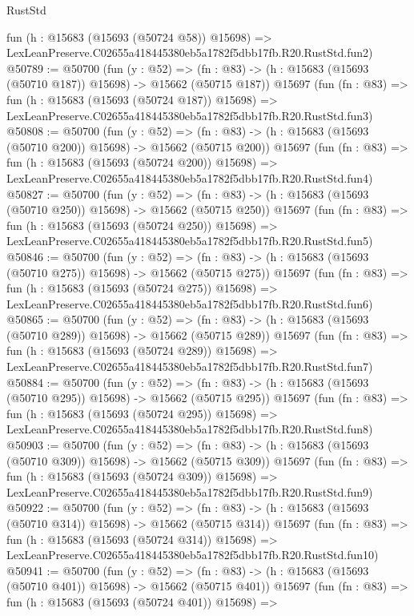 \begin{lexlean}{RustStd}
\begin{coremodule}
    fun (h : @15683 (@15693 (@50724 @58)) @15698) =>
    LexLeanPreserve.C02655a418445380eb5a1782f5dbb17fb.R20.RustStd.fun2)
@50789 := @50700
    (fun (y : @52) =>
    (fn : @83) -> (h : @15683 (@15693 (@50710 @187)) @15698) -> @15662 (@50715 @187))
    @15697
    (fun (fn : @83) =>
    fun (h : @15683 (@15693 (@50724 @187)) @15698) =>
    LexLeanPreserve.C02655a418445380eb5a1782f5dbb17fb.R20.RustStd.fun3)
@50808 := @50700
    (fun (y : @52) =>
    (fn : @83) -> (h : @15683 (@15693 (@50710 @200)) @15698) -> @15662 (@50715 @200))
    @15697
    (fun (fn : @83) =>
    fun (h : @15683 (@15693 (@50724 @200)) @15698) =>
    LexLeanPreserve.C02655a418445380eb5a1782f5dbb17fb.R20.RustStd.fun4)
@50827 := @50700
    (fun (y : @52) =>
    (fn : @83) -> (h : @15683 (@15693 (@50710 @250)) @15698) -> @15662 (@50715 @250))
    @15697
    (fun (fn : @83) =>
    fun (h : @15683 (@15693 (@50724 @250)) @15698) =>
    LexLeanPreserve.C02655a418445380eb5a1782f5dbb17fb.R20.RustStd.fun5)
@50846 := @50700
    (fun (y : @52) =>
    (fn : @83) -> (h : @15683 (@15693 (@50710 @275)) @15698) -> @15662 (@50715 @275))
    @15697
    (fun (fn : @83) =>
    fun (h : @15683 (@15693 (@50724 @275)) @15698) =>
    LexLeanPreserve.C02655a418445380eb5a1782f5dbb17fb.R20.RustStd.fun6)
@50865 := @50700
    (fun (y : @52) =>
    (fn : @83) -> (h : @15683 (@15693 (@50710 @289)) @15698) -> @15662 (@50715 @289))
    @15697
    (fun (fn : @83) =>
    fun (h : @15683 (@15693 (@50724 @289)) @15698) =>
    LexLeanPreserve.C02655a418445380eb5a1782f5dbb17fb.R20.RustStd.fun7)
@50884 := @50700
    (fun (y : @52) =>
    (fn : @83) -> (h : @15683 (@15693 (@50710 @295)) @15698) -> @15662 (@50715 @295))
    @15697
    (fun (fn : @83) =>
    fun (h : @15683 (@15693 (@50724 @295)) @15698) =>
    LexLeanPreserve.C02655a418445380eb5a1782f5dbb17fb.R20.RustStd.fun8)
@50903 := @50700
    (fun (y : @52) =>
    (fn : @83) -> (h : @15683 (@15693 (@50710 @309)) @15698) -> @15662 (@50715 @309))
    @15697
    (fun (fn : @83) =>
    fun (h : @15683 (@15693 (@50724 @309)) @15698) =>
    LexLeanPreserve.C02655a418445380eb5a1782f5dbb17fb.R20.RustStd.fun9)
@50922 := @50700
    (fun (y : @52) =>
    (fn : @83) -> (h : @15683 (@15693 (@50710 @314)) @15698) -> @15662 (@50715 @314))
    @15697
    (fun (fn : @83) =>
    fun (h : @15683 (@15693 (@50724 @314)) @15698) =>
    LexLeanPreserve.C02655a418445380eb5a1782f5dbb17fb.R20.RustStd.fun10)
@50941 := @50700
    (fun (y : @52) =>
    (fn : @83) -> (h : @15683 (@15693 (@50710 @401)) @15698) -> @15662 (@50715 @401))
    @15697
    (fun (fn : @83) =>
    fun (h : @15683 (@15693 (@50724 @401)) @15698) =>

\end{coremodule}
\end{lexlean}
